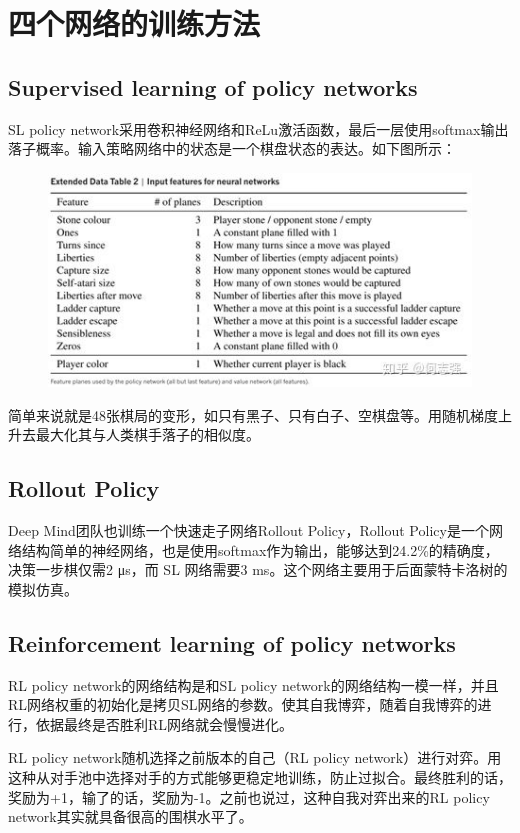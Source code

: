\documentclass[12pt]{article}
\begin{document}
\section{四个网络的训练方法\cite{Learning_AlphaGo}}
\subsection{Supervised learning of policy networks}
SL policy network采用卷积神经网络和ReLu激活函数，最后一层使用softmax输出落子概率。输入策略网络中的状态是一个棋盘状态的表达。如下图所示：

\begin{figure}[ht]
  \centering
  \includegraphics[width=.8\textwidth]{fig/AlphaGoSLNetworkExample.jpg} 
\end{figure}

简单来说就是48张棋局的变形，如只有黑子、只有白子、空棋盘等。用随机梯度上升去最大化其与人类棋手落子的相似度。

\subsection{Rollout Policy}
Deep Mind团队也训练一个快速走子网络Rollout Policy，Rollout Policy是一个网络结构简单的神经网络，也是使用softmax作为输出，能够达到24.2\%的精确度，决策一步棋仅需2 μs，而 SL 网络需要3 ms。这个网络主要用于后面蒙特卡洛树的模拟仿真。

\subsection{Reinforcement learning of policy networks}
RL policy network的网络结构是和SL policy network的网络结构一模一样，并且RL网络权重的初始化是拷贝SL网络的参数。使其自我博弈，随着自我博弈的进行，依据最终是否胜利RL网络就会慢慢进化。

RL policy network随机选择之前版本的自己（RL policy network）进行对弈。用这种从对手池中选择对手的方式能够更稳定地训练，防止过拟合。最终胜利的话，奖励为+1，输了的话，奖励为-1。之前也说过，这种自我对弈出来的RL policy network其实就具备很高的围棋水平了。
\end{document}
